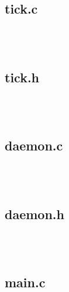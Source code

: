 \documentclass{article}
\begin{document}
\subsection*{tick.c}

\begin{verbatim}



\end{verbatim}

\subsection*{tick.h}

\begin{verbatim}



\end{verbatim}

\subsection*{daemon.c}

\begin{verbatim}



\end{verbatim}

\subsection*{daemon.h}

\begin{verbatim}



\end{verbatim}

\subsection*{main.c}

\begin{verbatim}



\end{verbatim}
\end{document}
